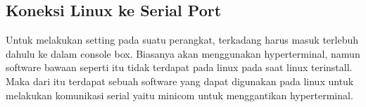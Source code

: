 	\subsection{Koneksi Linux ke Serial Port}
	Untuk melakukan setting pada suatu perangkat, terkadang harus masuk terlebuh dahulu ke dalam console box. Biasanya akan menggunakan hyperterminal, namun software bawaan seperti itu tidak terdapat pada linux pada saat linux terinstall. Maka dari itu terdapat sebuah software yang dapat digunakan pada linux untuk melakukan komunikasi serial yaitu minicom untuk menggantikan hyperterminal.
	
		
